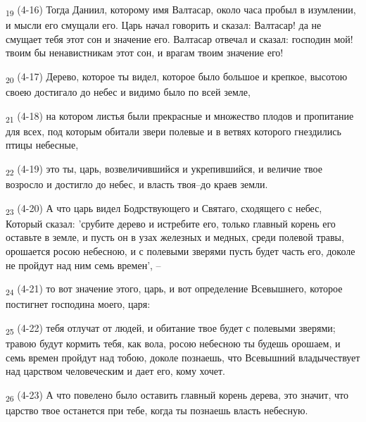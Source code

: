 \begin{tcolorbox}
\textsubscript{19} (4-16) Тогда Даниил, которому имя Валтасар, около часа пробыл в изумлении, и мысли его смущали его. Царь начал говорить и сказал: Валтасар! да не смущает тебя этот сон и значение его. Валтасар отвечал и сказал: господин мой! твоим бы ненавистникам этот сон, и врагам твоим значение его!
\end{tcolorbox}
\begin{tcolorbox}
\textsubscript{20} (4-17) Дерево, которое ты видел, которое было большое и крепкое, высотою своею достигало до небес и видимо было по всей земле,
\end{tcolorbox}
\begin{tcolorbox}
\textsubscript{21} (4-18) на котором листья были прекрасные и множество плодов и пропитание для всех, под которым обитали звери полевые и в ветвях которого гнездились птицы небесные,
\end{tcolorbox}
\begin{tcolorbox}
\textsubscript{22} (4-19) это ты, царь, возвеличившийся и укрепившийся, и величие твое возросло и достигло до небес, и власть твоя--до краев земли.
\end{tcolorbox}
\begin{tcolorbox}
\textsubscript{23} (4-20) А что царь видел Бодрствующего и Святаго, сходящего с небес, Который сказал: 'срубите дерево и истребите его, только главный корень его оставьте в земле, и пусть он в узах железных и медных, среди полевой травы, орошается росою небесною, и с полевыми зверями пусть будет часть его, доколе не пройдут над ним семь времен', --
\end{tcolorbox}
\begin{tcolorbox}
\textsubscript{24} (4-21) то вот значение этого, царь, и вот определение Всевышнего, которое постигнет господина моего, царя:
\end{tcolorbox}
\begin{tcolorbox}
\textsubscript{25} (4-22) тебя отлучат от людей, и обитание твое будет с полевыми зверями; травою будут кормить тебя, как вола, росою небесною ты будешь орошаем, и семь времен пройдут над тобою, доколе познаешь, что Всевышний владычествует над царством человеческим и дает его, кому хочет.
\end{tcolorbox}
\begin{tcolorbox}
\textsubscript{26} (4-23) А что повелено было оставить главный корень дерева, это значит, что царство твое останется при тебе, когда ты познаешь власть небесную.
\end{tcolorbox}
